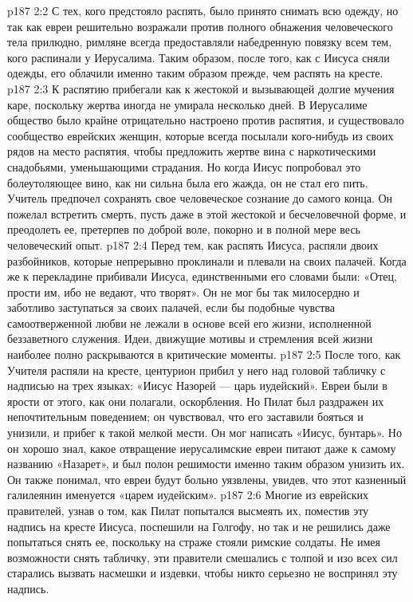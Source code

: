 \vs p187 2:2 С тех, кого предстояло распять, было принято снимать всю одежду, но так как евреи решительно возражали против полного обнажения человеческого тела прилюдно, римляне всегда предоставляли набедренную повязку всем тем, кого распинали у Иерусалима. Таким образом, после того, как с Иисуса сняли одежды, его облачили именно таким образом прежде, чем распять на кресте.
\vs p187 2:3 К распятию прибегали как к жестокой и вызывающей долгие мучения каре, поскольку жертва иногда не умирала несколько дней. В Иерусалиме общество было крайне отрицательно настроено против распятия, и существовало сообщество еврейских женщин, которые всегда посылали кого\hyp{}нибудь из своих рядов на место распятия, чтобы предложить жертве вина с наркотическими снадобьями, уменьшающими страдания. Но когда Иисус попробовал это болеутоляющее вино, как ни сильна была его жажда, он не стал его пить. Учитель предпочел сохранять свое человеческое сознание до самого конца. Он пожелал встретить смерть, пусть даже в этой жестокой и бесчеловечной форме, и преодолеть ее, претерпев по доброй воле, покорно и в полной мере весь человеческий опыт.
\vs p187 2:4 Перед тем, как распять Иисуса, распяли двоих разбойников, которые непрерывно проклинали и плевали на своих палачей. Когда же к перекладине прибивали Иисуса, единственными его словами были: «Отец, прости им, ибо не ведают, что творят». Он не мог бы так милосердно и заботливо заступаться за своих палачей, если бы подобные чувства самоотверженной любви не лежали в основе всей его жизни, исполненной беззаветного служения. Идеи, движущие мотивы и стремления всей жизни наиболее полно раскрываются в критические моменты.
\vs p187 2:5 После того, как Учителя распяли на кресте, центурион прибил у него над головой табличку с надписью на трех языках: «Иисус Назорей --- царь иудейский». Евреи были в ярости от этого, как они полагали, оскорбления. Но Пилат был раздражен их непочтительным поведением; он чувствовал, что его заставили бояться и унизили, и прибег к такой мелкой мести. Он мог написать «Иисус, бунтарь». Но он хорошо знал, какое отвращение иерусалимские евреи питают даже к самому названию «Назарет», и был полон решимости именно таким образом унизить их. Он также понимал, что евреи будут больно уязвлены, увидев, что этот казненный галилеянин именуется «царем иудейским».
\vs p187 2:6 Многие из еврейских правителей, узнав о том, как Пилат попытался высмеять их, поместив эту надпись на кресте Иисуса, поспешили на Голгофу, но так и не решились даже попытаться снять ее, поскольку на страже стояли римские солдаты. Не имея возможности снять табличку, эти правители смешались с толпой и изо всех сил старались вызвать насмешки и издевки, чтобы никто серьезно не воспринял эту надпись.

